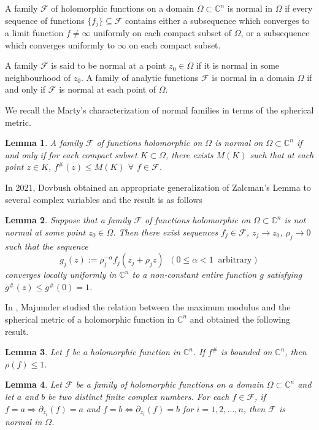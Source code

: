 \documentclass[11pt, reqno]{amsart}
\newtheorem*{cor A}{Corollary A}
\newtheorem*{cor B}{Corollary B}
\newtheorem{lem}{Lemma}[section]
\numberwithin{equation}{section}
\begin{document}
A family $\mathcal{F}$ of holomorphic functions on a domain $\Omega\subset \mathbb{C}^n$ is normal in $\Omega$ if every sequence of functions $\{f_j\}\subseteq \mathcal{F}$ contains either a subsequence which converges to a limit function $f\neq \infty$ uniformly on each compact subset of $\Omega$, or a subsequence which converges uniformly to $\infty$ on each compact subset.

A family $\mathcal{F}$ is said to be normal at a point $z_0\in \Omega$ if it is normal in some neighbourhood of $z_0$. A family of analytic functions $\mathcal{F}$ is normal in a domain $\Omega$ if and only if $\mathcal{F}$ is normal at each point of $\Omega$.

\medskip
We recall the Marty's characterization of normal families in terms of the spherical metric.

\begin{lem}\label{ln2.1}\cite[Theorem 2.1]{PVD1} A family $\mathcal{F}$ of functions holomorphic on $\Omega$ is normal on $\Omega\subset \mathbb{C}^n$ if and only if for each compact subset $K\subset \Omega$, there exists $M(K)$ such that at each point $z\in K$,
$f^{\#}(z)\leq M(K)$ $\forall$ $f\in\mathcal{F}$.
\end{lem} 

In 2021, Dovbush \cite{PVD2} obtained an appropriate generalization of Zalcman's Lemma \cite{LZ1} to several complex variables and the result is as follows
\begin{lem}\label{ln2.1a} \cite[Theorem 1.1]{PVD2} Suppose that a family $\mathcal{F}$ of functions holomorphic on $\Omega\subset \mathbb{C}^n$ is not normal at some point $z_0\in\Omega$. Then there exist sequences $f_j\in\mathcal{F}$, $z_j\to z_0$, $\rho_j\to 0$ such that the sequence
\[g_j(z):=\rho_j^{-\alpha}f_j(z_j+\rho_jz)\;\;(0\leq \alpha<1\;\;\text{arbitrary})\]
converges locally uniformly in $\mathbb{C}^n$ to a non-constant entire function $g$ satisfying $g^{\#}(z)\leq g^{\#}(0)=1$.
\end{lem}

In \cite{Majumder-2026}, Majumder studied the relation between the maximum modulus and the spherical metric of a holomorphic function in $\mathbb{C}^n$ and obtained the following result.
\begin{lem}\label{ln2.2}\cite{Majumder-2026} Let $f$ be a holomorphic function in $\mathbb{C}^n$. If $f^{\#}$ is bounded on $\mathbb{C}^n$, then $\rho(f)\leq 1$.
\end{lem}


\begin{lem}\label{ln2.3} \cite{Majumder-2026} Let $\mathcal{F}$ be a family of holomorphic functions on a domain $\Omega\subset \mathbb{C}^n$ and let $a$ and $b$ be two distinct finite complex numbers. For each $f\in \mathcal{F}$, if $f=a\Rightarrow \partial_{z_i}(f)=a$ and $f=b\Leftrightarrow \partial_{z_i}(f)=b$ for $i=1,2,\ldots,n$, then $\mathcal{F}$ is normal in $\Omega$.
\end{lem}
\end{document}
